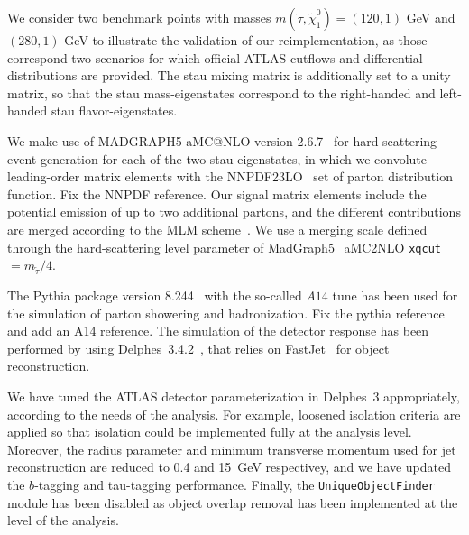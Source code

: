 \documentclass{ws-mpla}
\begin{document}
We consider two benchmark points with masses $m(\tilde{\tau},\tilde{\chi}^0_1)=(120,1)$ GeV and $(280,1)$ GeV to illustrate the validation of our reimplementation, as those correspond two scenarios for which official ATLAS cutflows and differential distributions are provided.
The stau mixing matrix is additionally set to a unity matrix, so that the stau mass-eigenstates correspond to the right-handed and left-handed stau flavor-eigenstates.

We make use of MADGRAPH5 aMC@NLO version 2.6.7~\cite{Alwall:2014hca} for hard-scattering event generation for each of the two stau eigenstates, in which we convolute leading-order matrix elements with the NNPDF23LO~\cite{Ball:2013hta} set of parton distribution function. {\color{red} Fix the NNPDF reference.} Our signal matrix elements include the potential emission of up to two additional partons, and the different contributions are merged according to the MLM scheme~\cite{Mangano:2006rw,Alwall:2008qv}. We use a merging scale defined through the hard-scattering level parameter of {\sc MadGraph5\_aMC2NLO} {\tt xqcut} $= m_{\tilde{\tau}}/4$.

The {\sc Pythia} package version 8.244~\cite{Sjostrand:2014zea} with the so-called $A14$ tune\cite{} has been used for the simulation of parton showering and hadronization. {\color{red}Fix the pythia reference and add an A14 reference}. The simulation of the detector response has been performed by using {\sc Delphes}~3.4.2~\cite{deFavereau:2013fsa}, that relies on {\sc FastJet}~\cite{Cacciari:2011ma} for object reconstruction.

We have tuned the ATLAS detector parameterization in {\sc Delphes}~3 appropriately, according to the needs of the analysis.
For example, loosened isolation criteria are applied so that isolation could be implemented fully at the analysis level.
Moreover, the radius parameter and minimum transverse momentum used for jet reconstruction are reduced to 0.4 and 15~GeV respectivey, and we have updated the $b$-tagging and tau-tagging performance.
Finally, the {\tt UniqueObjectFinder} module has been disabled as object overlap removal has been implemented at the level of the analysis.
\end{document}
